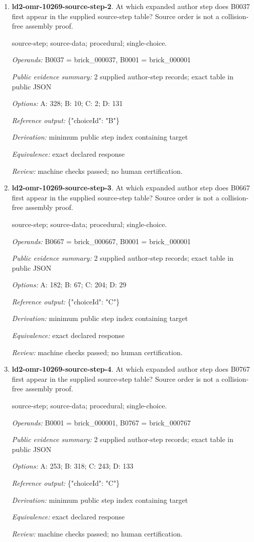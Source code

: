 \begin{enumerate}
\item \textbf{ld2-omr-10269-source-step-2}. At which expanded author step does B0037 first appear in the supplied source-step table? Source order is not a collision-free assembly proof.
\par{\small source-step; source-data; procedural; single-choice.\par\textit{Operands:} B0037 = brick\_000037, B0001 = brick\_000001\par\textit{Public evidence summary:} 2 supplied author-step records; exact table in public JSON\par\textit{Options:} A: 328; B: 10; C: 2; D: 131\par\textit{Reference output:} \{"choiceId": "B"\}\par\textit{Derivation:} minimum public step index containing target\par\textit{Equivalence:} exact declared response\par\textit{Review:} machine checks passed; no human certification.}
\item \textbf{ld2-omr-10269-source-step-3}. At which expanded author step does B0667 first appear in the supplied source-step table? Source order is not a collision-free assembly proof.
\par{\small source-step; source-data; procedural; single-choice.\par\textit{Operands:} B0667 = brick\_000667, B0001 = brick\_000001\par\textit{Public evidence summary:} 2 supplied author-step records; exact table in public JSON\par\textit{Options:} A: 182; B: 67; C: 204; D: 29\par\textit{Reference output:} \{"choiceId": "C"\}\par\textit{Derivation:} minimum public step index containing target\par\textit{Equivalence:} exact declared response\par\textit{Review:} machine checks passed; no human certification.}
\item \textbf{ld2-omr-10269-source-step-4}. At which expanded author step does B0767 first appear in the supplied source-step table? Source order is not a collision-free assembly proof.
\par{\small source-step; source-data; procedural; single-choice.\par\textit{Operands:} B0001 = brick\_000001, B0767 = brick\_000767\par\textit{Public evidence summary:} 2 supplied author-step records; exact table in public JSON\par\textit{Options:} A: 253; B: 318; C: 243; D: 133\par\textit{Reference output:} \{"choiceId": "C"\}\par\textit{Derivation:} minimum public step index containing target\par\textit{Equivalence:} exact declared response\par\textit{Review:} machine checks passed; no human certification.}

\end{enumerate}
